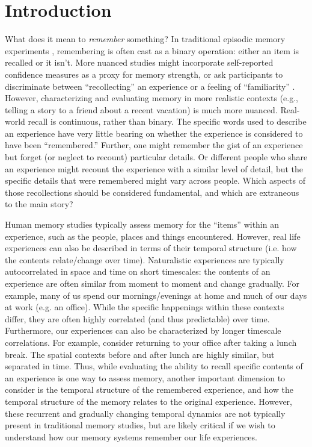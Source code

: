 \documentclass{article}
\begin{document}
{\section{Introduction}

What does it mean to \textit{remember} something? In traditional episodic memory experiments \citep[e.g., list-learning or trial-based experiments;][]{Murd62a, Kaha96}, remembering is often cast as a binary operation: either an item is recalled or it isn't. More nuanced studies might incorporate self-reported confidence measures as a proxy for memory strength, or ask participants to discriminate between ``recollecting'' an experience or a feeling of ``familiarity'' \citep{Yone02}. However, characterizing and evaluating memory in more realistic contexts (e.g., telling a story to a friend about a recent vacation) is much more nuanced. Real-world recall is continuous, rather than binary.  The specific words used to describe an experience have very little bearing on whether the experience is considered to have been ``remembered.''  Further, one might remember the gist of an experience but forget (or neglect to recount) particular details.  Or different people who share an experience might recount the experience with a similar level of detail, but the specific details that were remembered might vary across people.  Which aspects of those recollections should be considered fundamental, and which are extraneous to the main story?

Human memory studies typically assess memory for the ``items'' within an experience, such as the people, places and things encountered. However, real life experiences can also be described in terms of their temporal structure (i.e. how the contents relate/change over time).  Naturalistic experiences are typically autocorrelated in space and time on short timescales: the contents of an experience are often similar from moment to moment and change gradually. For example, many of us spend our mornings/evenings at home and much of our days at work (e.g. an office). While the specific happenings within these contexts differ, they are often highly correlated (and thus predictable) over time. Furthermore, our experiences can also be characterized by longer timescale correlations. For example, consider returning to your office after taking a lunch break. The spatial contexts before and after lunch are highly similar, but separated in time. Thus, while evaluating the ability to recall specific contents of an experience is one way to assess memory, another important dimension to consider is the temporal structure of the remembered experience, and how the temporal structure of the memory relates to the original experience. However, these recurrent and gradually changing temporal dynamics are not typically present in traditional memory studies, but are likely critical if we wish to understand how our memory systems remember our life experiences.

}
\end{document}

